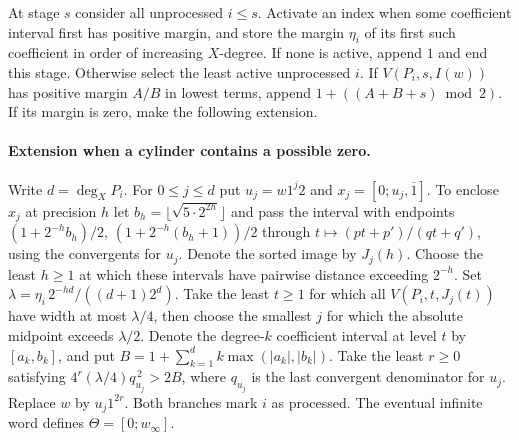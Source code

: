 \documentclass[11pt,a4paper]{article}
\theoremstyle{definition}
\theoremstyle{remark}
\begin{document}
At stage $s$ consider all unprocessed $i\le s$. Activate an index
when some coefficient interval first has positive margin, and store
the margin $\eta_i$ of its first such coefficient in order of increasing
$X$-degree. If none is active, append $1$ and end this stage. Otherwise
select the least active unprocessed $i$. If $V(P_i,s,I(w))$ has
positive margin $A/B$ in lowest terms, append $1+((A+B+s)\bmod 2)$.
If its margin is zero, make the following extension.

\paragraph{Extension when a cylinder contains a possible zero.}
Write $d=\deg_X P_i$. For $0\le j\le d$ put $u_j=w1^j2$ and
$x_j=[0;u_j,\overline1]$. To enclose $x_j$ at precision $h$ let
$b_h=\lfloor\sqrt{5\cdot2^{2h}}\rfloor$ and pass the interval with
endpoints $(1+2^{-h}b_h)/2$, $(1+2^{-h}(b_h+1))/2$ through
$t\mapsto(pt+p')/(qt+q')$, using the convergents for $u_j$.
Denote the sorted image by $J_j(h)$. Choose the least $h\ge1$ at which
these intervals have pairwise distance exceeding $2^{-h}$. Set
$\lambda=\eta_i\,2^{-hd}/((d+1)2^d)$. Take the least $t\ge1$ for
which all $V(P_i,t,J_j(t))$ have width at most $\lambda/4$, then
choose the smallest $j$ for which the absolute midpoint exceeds
$\lambda/2$. Denote the degree-$k$ coefficient interval at level $t$
by $[a_k,b_k]$, and put $B=1+\sum_{k=1}^d k\max(|a_k|,|b_k|)$.
Take the least $r\ge0$ satisfying $4^r(\lambda/4)q_{u_j}^{\,2}>2B$,
where $q_{u_j}$ is the last convergent denominator for $u_j$.
Replace $w$ by $u_j1^{2r}$. Both branches mark $i$ as processed.
The eventual infinite word defines $\Theta=[0;w_\infty]$.
\end{document}
